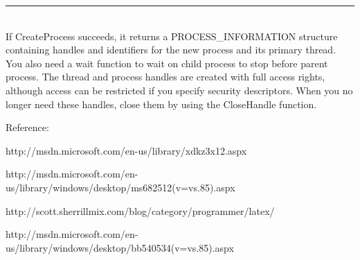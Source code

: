 \documentclass[10pt,draftclsnofoot,onecolumn,journal,compsoc]{IEEEtran}
\begin{document}
\noindent\rule{15.5cm}{0.4pt}\\
If CreateProcess succeeds, it returns a PROCESS\_INFORMATION structure containing handles and identifiers for the new process and its primary thread. You also need a wait function to wait on child process to stop before parent process. The thread and process handles are created with full access rights, although access can be restricted if you specify security descriptors. When you no longer need these handles, close them by using the CloseHandle function.\par
\par
Reference:\par
http://msdn.microsoft.com/en-us/library/xdkz3x12.aspx\par
http://msdn.microsoft.com/en-us/library/windows/desktop/ms682512(v=vs.85).aspx\par
http://scott.sherrillmix.com/blog/category/programmer/latex/\par
http://msdn.microsoft.com/en-us/library/windows/desktop/bb540534(v=vs.85).aspx
\newpage


\newpage

\end{document}

